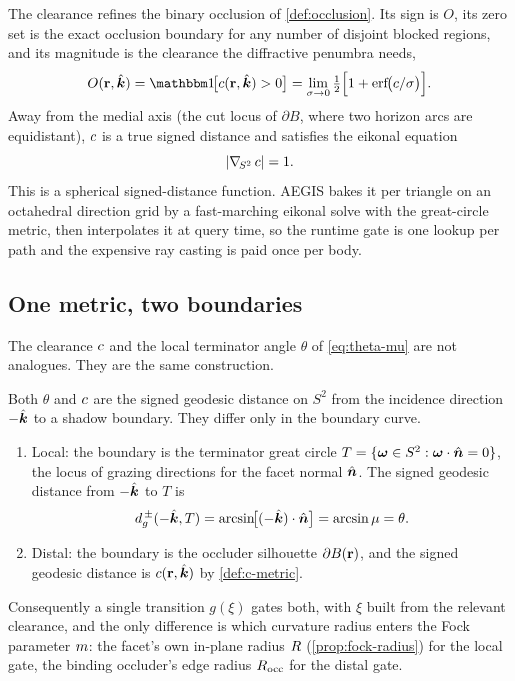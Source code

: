 The clearance refines the binary occlusion of \cref{def:occlusion}. Its sign is
$O$, its zero set is the exact occlusion boundary for any number of disjoint
blocked regions, and its magnitude is the clearance the diffractive penumbra
needs,
\begin{equation}\label{eq:c-to-O}
  O(\rr,\khat) = \ident\!\bigl[\clr(\rr,\khat)>0\bigr]
  = \lim_{\sigma\to0}\half\Bigl[1+\erf\!\bigl(\clr/\sigma\bigr)\Bigr].
\end{equation}
Away from the medial axis (the cut locus of $\partial B$, where two horizon arcs
are equidistant), $c$ is a true signed distance and satisfies the eikonal
equation
\begin{equation}\label{eq:eikonal}
  \abs{\nabla_{\!S^2}\,c} = 1 .
\end{equation}
This is a spherical signed-distance function. AEGIS bakes it per triangle on an
octahedral direction grid by a fast-marching eikonal solve with the great-circle
metric, then interpolates it at query time, so the runtime gate is one lookup per
path and the expensive ray casting is paid once per body.

\subsection{One metric, two boundaries}\label{sec:cmetric-unify}

The clearance $c$ and the local terminator angle $\theta$ of \cref{eq:theta-mu}
are not analogues. They are the same construction.

\begin{proposition}\label{prop:unify}
Both $\theta$ and $c$ are the signed geodesic distance on $S^2$ from the
incidence direction $-\hat{\bm{k}}$ to a shadow boundary. They differ only in the
boundary curve.
\begin{enumerate}
  \item Local: the boundary is the terminator great circle
    $T=\{\bm{\omega}\in S^2 : \bm{\omega}\cdot\hat{\bm{n}}=0\}$, the locus of grazing
    directions for the facet normal $\hat{\bm{n}}$. The signed geodesic distance from
    $-\hat{\bm{k}}$ to $T$ is
    \begin{equation}\label{eq:theta-as-distance}
      d_g^{\,\pm}(-\hat{\bm{k}},T) = \arcsin\!\bigl[(-\hat{\bm{k}})\cdot\hat{\bm{n}}\bigr]
      = \arcsin\mu = \theta .
    \end{equation}
  \item Distal: the boundary is the occluder silhouette $\partial B(\mathbf{r})$, and the
    signed geodesic distance is $c(\mathbf{r},\hat{\bm{k}})$ by \cref{def:c-metric}.
\end{enumerate}
Consequently a single transition $g(\xi)$ gates both, with $\xi$ built from the
relevant clearance, and the only difference is which curvature radius enters the
Fock parameter $m$: the facet's own in-plane radius $R$
(\cref{prop:fock-radius}) for the local gate, the binding occluder's edge radius
$R_{\mathrm{occ}}$ for the distal gate.
\end{proposition}

